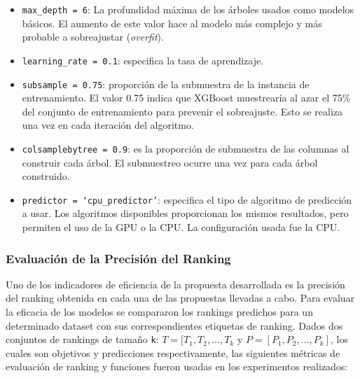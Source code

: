 \begin{description}
\begin{itemize}
		\item \texttt{max\_depth = 6}: La profundidad máxima de los árboles usados como modelos básicos. El aumento de este valor hace al modelo más complejo y más probable a sobreajustar (\textit{overfit}).
		\item \texttt{learning\_rate = 0.1}: especifica la tasa de aprendizaje.
		\item \texttt{subsample = 0.75}: proporción de la submuestra de la instancia de entrenamiento. El valor 0.75 indica que XGBoost muestrearía al azar el 75\% del conjunto de entrenamiento para prevenir el sobreajuste. Esto se realiza una vez en cada iteración del algoritmo.
		\item \texttt{colsamplebytree = 0.9}: es la proporción de submuestra de las columnas al construir cada árbol. El submuestreo ocurre una vez para cada árbol construido.
 		\item \texttt{predictor = `cpu\_predictor'}: especifica el tipo de algoritmo de predicción a usar. Los algoritmos disponibles proporcionan los mismos resultados, pero permiten el uso de la GPU o la CPU. La configuración usada fue la CPU.
	\end{itemize}
\end{description}


\subsubsection{Evaluación de la Precisión del Ranking}

%
%
%

Uno de los indicadores de eficiencia de la propuesta desarrollada es la precisión del ranking obtenida en cada una de las propuestas llevadas a cabo. Para evaluar la eficacia de los modelos se compararon los rankings predichos para un determinado dataset con sus correspondientes etiquetas de ranking. Dados dos conjuntos de rankings de tamaño \texttt{k}: $T = [T_1, T_2, ..., T_k$ y $P = [P_1, P_2, ..., P_k]$, los cuales son objetivos y predicciones respectivamente, las siguientes métricas de evaluación de ranking y funciones fueron usadas en los experimentos realizados:

